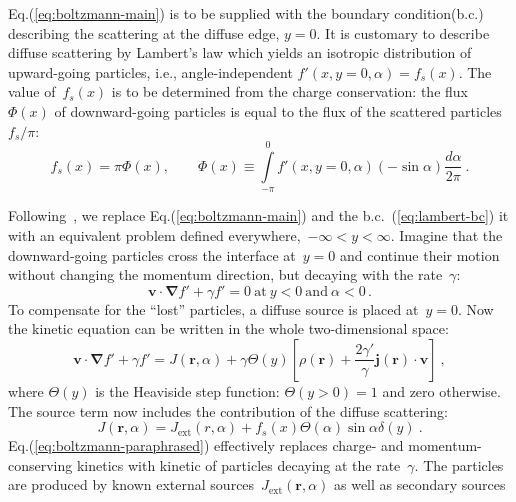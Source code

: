 \documentclass[preprint,aps,eqsecnum]{revtex4-1}
\begin{document}
Eq.(\ref{eq:boltzmann-main})
is to be supplied with the boundary condition(b.c.) describing
the scattering at the diffuse edge, $y = 0$.
It is customary to describe diffuse
scattering by Lambert's law which yields an isotropic
distribution of upward-going particles, i.e., angle-independent
\mbox{$f'(x, y=0, \alpha) = f_s(x)$}.
The value of~$f_s(x)$ is to be determined from the charge conservation:
the flux~$\Phi(x)$ of downward-going particles is equal
to the flux of the scattered particles $f_s / \pi$:
\begin{equation}
  \label{eq:lambert-bc}
  f_s(x) = \pi \Phi(x),  \qquad
  \Phi (x) \equiv \int\limits_{-\pi}^{0} f'(x, y = 0, \alpha)
  (-\sin \alpha) \frac{d\alpha}{2\pi} \ .
\end{equation}

Following~\cite{bib:Reuter-Sondheimer},  we replace Eq.(\ref{eq:boltzmann-main})
and the b.c.~(\ref{eq:lambert-bc}) it with an equivalent
problem defined everywhere,~$-\infty < y < \infty$.
Imagine that the downward-going particles
cross the interface at~$y = 0$ and continue their motion without changing
the momentum direction, but  decaying with the rate~$\gamma$:
\begin{equation}
{\bm v}\cdot{\bm \nabla} f' + \gamma f' = 0
\ \mathrm{at}\ y < 0\  \mathrm{and}\ \alpha < 0\,.
\end{equation}
To compensate for the ``lost'' particles, a diffuse source is placed
at~$y = 0$. Now the kinetic equation can be written in the whole
two-dimensional space:
\begin{equation}
  \label{eq:boltzmann-paraphrased}
  {\bm v} \cdot {\bm \nabla} f' + \gamma f' = J({\bm r}, \alpha)
  + \gamma \Theta(y)\left[\rho({\bm r}) + \frac{2\gamma'}{\gamma} {\bm j}({\bm r})\cdot{\bm v}
  \right] \ ,
\end{equation}
where $\Theta(y)$ is the Heaviside step function:
$\Theta(y>0) = 1$ and zero otherwise.
The source term now includes the contribution of the diffuse scattering:
\begin{equation}
  J({\bm r}, \alpha) = J_\mathrm{ext}(r, \alpha)
  + f_s(x)  \Theta(\alpha) \sin\alpha  \delta(y)\ .
\end{equation}
Eq.(\ref{eq:boltzmann-paraphrased}) effectively replaces charge- and
momentum-conserving kinetics with kinetic of particles decaying
at the rate~$\gamma$. The particles are produced by known external
sources~$J_\mathrm{ext}({\bm r}, \alpha)$ as well as secondary sources
\end{document}
